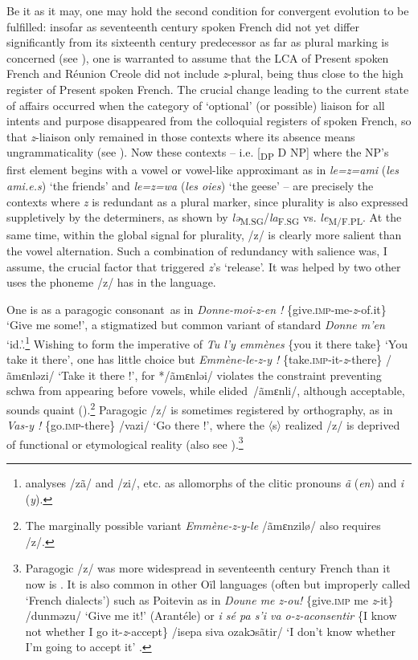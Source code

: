 \documentclass[output=paper]{langscibook}
\begin{document}
Be it as it may, one may hold the second condition for convergent evolution to be fulfilled: insofar as seventeenth century spoken French did not yet differ significantly from its sixteenth century predecessor as far as plural marking is concerned (see \citealt{Brunot1939}), one is warranted to assume that the LCA of Present spoken French and Réunion Creole did not include \textit{z}{}-plural, being thus close to the high register of Present spoken French. The crucial change leading to the current state of affairs occurred when the category of ‘optional’ (or possible) liaison for all intents and purpose disappeared from the colloquial registers of spoken French, so that \textit{z}{}-liaison only remained in those contexts where its absence means ungrammaticality (see \citealt{Encrevé1988, BonamiEtAl2005}). Now these contexts -- i.e. [\textsubscript{DP} D NP] where the NP’s first element begins with a vowel or vowel-like approximant as in \textit{le=z=ami} (\textit{les ami.e.s}) ‘the friends’ and \textit{le=z=wa} (\textit{les oies}) ‘the geese’ -- are precisely the contexts where \textit{z} is redundant as a plural marker, since plurality is also expressed suppletively by the determiners, as shown by \textit{lə}\textsubscript{M.SG}/\textit{la}\textsubscript{F.SG} vs. \textit{le}\textsubscript{M/F.PL}. At the same time, within the global signal for plurality, /z/ is clearly more salient than the vowel alternation. Such a combination of redundancy with salience was, I assume, the crucial factor that triggered \textit{z}’s ‘release’. It was helped by two other uses the phoneme /z/ has in the language.

One is as a paragogic consonant~as in \textit{Donne-moi-z-en !} \{give.\textsc{imp}{}-me-\textit{z}{}-of.it\} ‘Give me some!’, a stigmatized but common variant of standard \textit{Donne m’en} ‘id.’.\footnote{\citet{Morin1979,Morin2005} analyses /zã/ and /zi/, etc. as allomorphs of the clitic pronouns \textit{ã} (\textit{en}) and \textit{i} (\textit{y}).}  Wishing to form the imperative of \textit{Tu l’y emmènes} \{you it there take\} ‘You take it there’, one has little choice but \textit{Emmène-le-z-y !} \{take.\textsc{imp}{}-it-\textit{z}{}-there\} /ãmɛnləzi/ ‘Take it there !’, for */ãmɛnləi/ violates the constraint preventing schwa from appearing before vowels, while elided~/ãmɛnli/, although acceptable, sounds quaint (\citealt[87]{MilnerRegnault1987}).\footnote{The marginally possible variant \textit{Emmène-z-y-le} /ãmɛnzilø/ also requires /z/.} Paragogic /z/ is sometimes registered by orthography, as in \textit{Vas-y !} \{go.\textsc{imp}{}-there\} /vazi/ ‘Go there !’, where the 〈s〉 realized /z/ is deprived of functional or etymological reality (also see \citealt{Frei1929/2007}).\footnote{Paragogic /z/ was more widespread in seventeenth century French than it now is \citep{Brunot1939}. It is also common in other Oïl languages (often but improperly called ‘French dialects’) such as Poitevin as in \textit{Doune me z-ou!} \{give.\textsc{imp} me \textit{z}{}-it\} /dunməzu/ ‘Give me it!’ (Arantéle) or \textit{i sé pa s’i va o-z-aconsentir} \{I know not whether I go it-\textit{z}{}-accept\} /isepa siva ozakɔsãtir/ ‘I don’t know whether I’m going to accept it’ \citep[29]{Gautier1986}.}
\end{document}
